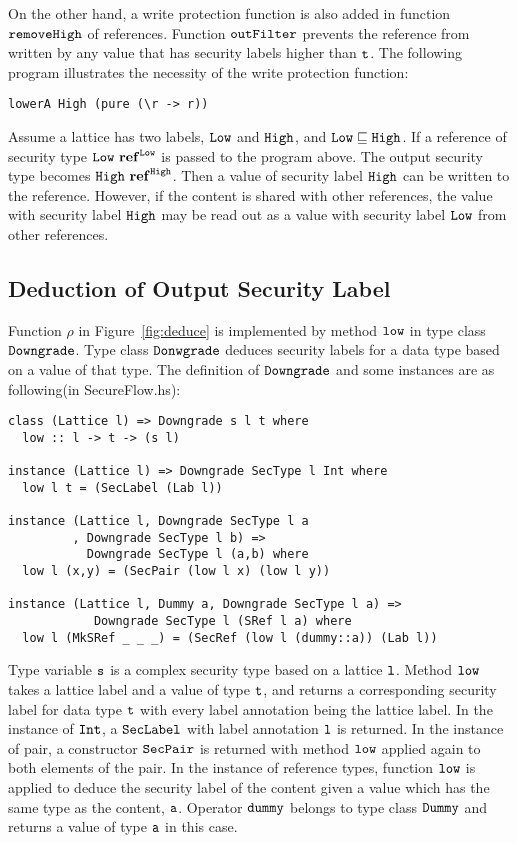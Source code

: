\documentclass{report}
\newcommand{\co}[1]{$\cod{#1}$}
\begin{document}
On the other hand, a write protection function is also added in function \co{removeHigh} of references. Function
\co{outFilter} prevents the reference from written by any value that has security labels higher than \co{t}. 
The following program illustrates the necessity of the write protection function:
\begin{Verbatim}[fontsize=\small]
lowerA High (pure (\r -> r))
\end{Verbatim}
Assume a lattice has two labels, \co{Low} and \co{High}, and $\mathtt{Low}\sqsubseteq \mathtt{High}$. If a reference 
of security type $\mathtt{Low}~\mathbf{ref}^{\mathtt{Low}}$ is passed to the program above. The output 
security type becomes $\mathtt{High}~\mathbf{ref}^{\mathtt{High}}$. Then a value of security label \co{High} can
be written to the reference. However, if the content is shared with other references, the value with 
security label \co{High} may be read out as a value with security label \co{Low} from other references.

\subsection{Deduction of Output Security Label}
\label{chap5:lowerA:old}
Function $\rho$ in Figure~\ref{fig:deduce} is implemented by method \co{low} in type class \co{Downgrade}. 
Type class \co{Donwgrade} deduces security labels for a data type based on a value of
that type.
The definition of \co{Downgrade} and some instances are as following(in SecureFlow.hs): 
\begin{Verbatim}[fontsize=\small]
class (Lattice l) => Downgrade s l t where
  low :: l -> t -> (s l)

instance (Lattice l) => Downgrade SecType l Int where
  low l t = (SecLabel (Lab l))

instance (Lattice l, Downgrade SecType l a
         , Downgrade SecType l b) =>
           Downgrade SecType l (a,b) where
  low l (x,y) = (SecPair (low l x) (low l y))

instance (Lattice l, Dummy a, Downgrade SecType l a) =>
            Downgrade SecType l (SRef l a) where
  low l (MkSRef _ _ _) = (SecRef (low l (dummy::a)) (Lab l))
\end{Verbatim}
Type variable \co{s} is a complex security type based on a lattice \co{l}.
Method \co{low} takes a lattice label and a value of type \co{t}, and returns a corresponding security label 
for data type \co{t} with every label annotation being the lattice label.
In the instance of \co{Int}, a \co{SecLabel} with label annotation \co{l} is returned. 
In the instance of pair, a constructor \co{SecPair} is returned with method \co{low} applied again to both 
elements of the pair.
In the instance of reference types, function \co{low} is applied to deduce the security label of the content 
given a value which has the same type as the content, \co{a}.
Operator \co{dummy} belongs to type class \co{Dummy} and returns a value of type \co{a} in this case. 
\end{document}
